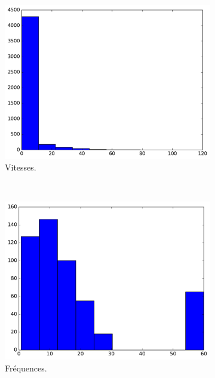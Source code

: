 	\begin{figure}[htb]
		\begin{subfigure}[t]{\subImgWclicks}
			\centering
			\includegraphics[width=\textwidth]{figures/ch3/chinaA_speed}
			\caption{Vitesses.}
			\label{fig:chinaA_speed}
		\end{subfigure}
		~
		\begin{subfigure}[t]{\subImgWclicks}
			\centering
			\includegraphics[width=\textwidth]{figures/ch3/chinaA_frequency}
			\caption{Fréquences.}
			\label{fig:chinaA_frequency}
		\end{subfigure}
		~
		\begin{subfigure}[t]{\subImgWclicks}
			\centering

\end{subfigure}
\end{figure}
